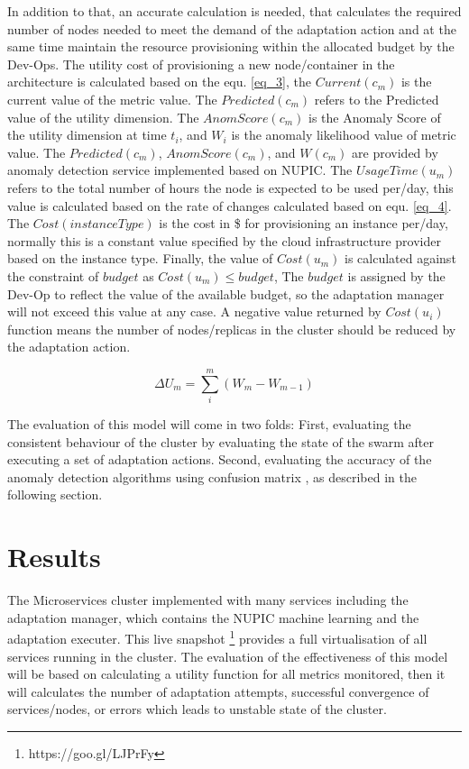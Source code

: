 \documentclass[graybox]{svmult}
\begin{document}
 In addition to that, an accurate calculation is needed, that calculates the required number of nodes needed to meet the demand of the adaptation action and at the same time maintain the resource provisioning within the allocated budget by the Dev-Ops. The utility cost of provisioning a new node/container in the architecture is calculated based on the equ. \ref{eq_3}, the $Current(c_{m})$ is the current value of the metric value. The $Predicted(c_{m})$ refers to the Predicted value of the utility dimension. The $AnomScore(c_{m})$ is the Anomaly Score of the utility dimension at time $t_{i}$, and $W_{i}$ is the anomaly likelihood value of metric value. The $Predicted(c_{m})$, $AnomScore(c_{m})$, and $W(c_{m})$ are provided by anomaly detection service implemented based on NUPIC. The $UsageTime(u_{m})$ refers to the total number of hours the node is expected to be used per/day, this value is calculated based on the rate of changes calculated based on equ. \ref{eq_4}. The $Cost(instanceType)$ is the cost in \$ for provisioning an instance per/day, normally this is a constant value specified by the cloud infrastructure provider based on the instance type. Finally, the value of $Cost(u_{m})$ is calculated against the constraint of $budget$ as $ Cost(u_{m})  \leq  budget $, The $budget$ is assigned by the Dev-Op to reflect the value of the available budget, so the adaptation manager will not exceed this value at any case. A negative value returned by $Cost(u_{i})$ function means the number of nodes/replicas in the cluster should be reduced by the adaptation action. 

 \begin{equation}
\label{eq_4}
\Delta U_{m}=\sum_{i}^{m} (W_{m} - W_{m-1})
\end{equation}
 
The evaluation of this model will come in two folds: First, evaluating the consistent behaviour of the cluster by evaluating the state of the swarm after executing a set of adaptation actions. Second, evaluating the accuracy of the anomaly detection algorithms using confusion matrix \cite{kohavi1998confusion},  as described in the following section. 
\section{Results} 
\label{sec:evaluation}
The Microservices cluster implemented with many services including the adaptation manager, which contains the NUPIC machine learning and the adaptation executer. This live snapshot \footnote{https://goo.gl/LJPrFy} provides a full virtualisation of all services running in the cluster. The evaluation of the effectiveness of this model will be based on calculating a utility function for all metrics monitored, then it will calculates the number of adaptation attempts, successful convergence of services/nodes, or errors which leads to unstable state of the cluster. 
\end{document}
